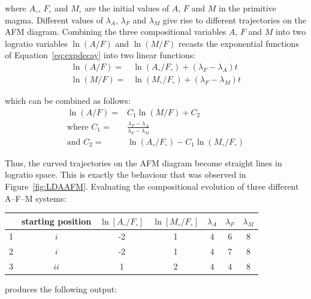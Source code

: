 \noindent where $A_\circ$, $F_\circ$ and $M_\circ$ are the initial
values of $A$, $F$ and $M$ in the primitive magma. Different values of
$\lambda_A$, $\lambda_F$ and $\lambda_M$ give rise to different
trajectories on the AFM diagram. Combining the three compositional
variables $A$, $F$ and $M$ into two logratio variables $\ln(A/F)$ and
$\ln(M/F)$ recasts the exponential functions of
Equation~\ref{eq:expdecay} into two linear functions:
\begin{align}
  \ln(A/F) = & \ln(A_\circ/F_\circ) + (\lambda_F-\lambda_A)t\\
  \ln(M/F) = & \ln(M_\circ/F_\circ) + (\lambda_F-\lambda_M)t
\end{align}

\noindent which can be combined as follows:
\begin{equation}
  \begin{split}
    \ln(A/F) = & C_1 \ln(M/F) + C_2 \\
    \mbox{where~} C_1 = & \frac{\lambda_F-\lambda_A}{\lambda_F-\lambda_M} \\
    \mbox{and~} C_2 = & \ln(A_\circ/F_\circ) - C_1 \ln(M_\circ/F_\circ) 
  \end{split}
\end{equation}

Thus, the curved trajectories on the AFM diagram become straight lines
in logratio space. This is exactly the behaviour that was observed in
Figure~\ref{fig:LDAAFM}. Evaluating the compositional evolution of
three different A--F--M systems:

\begin{center}
\begin{tabular}{c|cccccc}
  & starting position & $\ln[A_\circ/F_\circ]$ & $\ln[M_\circ/F_\circ]$ &
  $\lambda_A$ & $\lambda_F$ & $\lambda_M$ \\ \hline
  1 & $i$ & -2 & 1 & 4 & 6 & 8 \\
  2 & $i$ & -2 & 1 & 4 & 7 & 8 \\
  3 & $ii$ & 1 & 2 & 4 & 4 & 8 \\
\end{tabular}
\end{center}
  
\noindent produces the following output:

